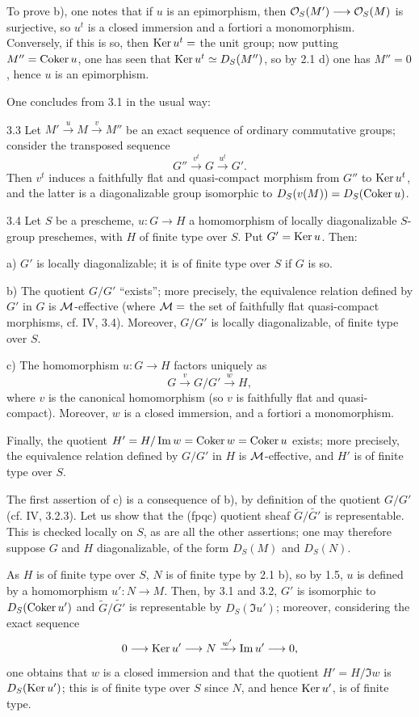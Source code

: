 To prove b), one notes that if $u$ is an epimorphism, then $\OS(M')\to\OS(M)$ is surjective, so $u^t$ is a closed immersion and a fortiori a monomorphism. Conversely, if this is so, then $\Ker u^t=$ the unit group; now putting $M''=\Coker u$, one has seen that $\Ker u^t\simeq D_S(M'')$, so by 2.1 d) one has $M''=0$, hence $u$ is an epimorphism.

One concludes from 3.1 in the usual way:
\begin{corollary}{3.3}\label{VIII.3.3}
Let $M'\xrightarrow{u}M\xrightarrow{v}M''$ be an exact sequence of ordinary commutative groups; consider the transposed sequence
\[
G''\xrightarrow{v^t}G\xrightarrow{u^t}G'.
\]
Then $v^t$ induces a faithfully flat and quasi-compact morphism from $G''$ to $\Ker u^t$, and the latter is a diagonalizable group isomorphic to $D_S(v(M))=D_S(\Coker u)$.
\end{corollary}
\begin{corollary}{3.4}\label{VIII.3.4}
Let $S$ be a prescheme, $u:G\to H$ a homomorphism of locally diagonalizable $S$-group preschemes, with $H$ of finite type over $S$. Put $G'=\Ker u$. Then:

a) $G'$ is locally diagonalizable; it is of finite type over $S$ if $G$ is so.

b) The quotient $G/G'$ ``exists''; more precisely, the equivalence relation defined by $G'$ in $G$ is $\cal M$-effective (where $\cal M=$ the set of faithfully flat quasi-compact morphisms, cf. IV, 3.4). Moreover, $G/G'$ is locally diagonalizable, of finite type over $S$.

c) The homomorphism $u:G\to H$ factors uniquely as
\[
G\xrightarrow{v}G/G'\xrightarrow{w}H,
\]
where $v$ is the canonical homomorphism (so $v$ is faithfully flat and quasi-compact). Moreover, $w$ is a closed immersion, and a fortiori a monomorphism.

Finally, the quotient $H'=H/\Im w=\Coker w=\Coker u$ exists; more precisely, the equivalence relation defined by $G/G'$ in $H$ is $\cal M$-effective, and $H'$ is of finite type over $S$.
\end{corollary}
The first assertion of c) is a consequence of b), by definition of the quotient $G/G'$ (cf. IV, 3.2.3). Let us show that the (fpqc) quotient sheaf $\widetilde G/\widetilde{G'}$ is representable. This is checked locally on $S$, as are all the other assertions; one may therefore suppose $G$ and $H$ diagonalizable, of the form $D_S(M)$ and $D_S(N)$.

As $H$ is of finite type over $S$, $N$ is of finite type by 2.1 b), so by 1.5, $u$ is defined by a homomorphism $u':N\to M$. Then, by 3.1 and 3.2, $G'$ is isomorphic to $D_S(\Coker u')$ and $\widetilde G/\widetilde{G'}$ is representable by $D_S(\Im u')$; moreover, considering the exact sequence
\[
0\to\Ker u'\to N\xrightarrow{w'}\Im u'\to0,
\]
one obtains that $w$ is a closed immersion and that the quotient $H'=H/\Im w$ is $D_S(\Ker u')$; this is of finite type over $S$ since $N$, and hence $\Ker u'$, is of finite type.

